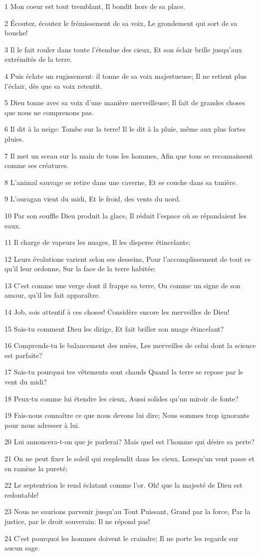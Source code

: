 \par 1 Mon coeur est tout tremblant, Il bondit hors de sa place.
\par 2 Écoutez, écoutez le frémissement de sa voix, Le grondement qui sort de sa bouche!
\par 3 Il le fait rouler dans toute l'étendue des cieux, Et son éclair brille jusqu'aux extrémités de la terre.
\par 4 Puis éclate un rugissement: il tonne de sa voix majestueuse; Il ne retient plus l'éclair, dès que sa voix retentit.
\par 5 Dieu tonne avec sa voix d'une manière merveilleuse; Il fait de grandes choses que nous ne comprenons pas.
\par 6 Il dit à la neige: Tombe sur la terre! Il le dit à la pluie, même aux plus fortes pluies.
\par 7 Il met un sceau sur la main de tous les hommes, Afin que tous se reconnaissent comme ses créatures.
\par 8 L'animal sauvage se retire dans une caverne, Et se couche dans sa tanière.
\par 9 L'ouragan vient du midi, Et le froid, des vents du nord.
\par 10 Par son souffle Dieu produit la glace, Il réduit l'espace où se répandaient les eaux.
\par 11 Il charge de vapeurs les nuages, Il les disperse étincelants;
\par 12 Leurs évolutions varient selon ses desseins, Pour l'accomplissement de tout ce qu'il leur ordonne, Sur la face de la terre habitée;
\par 13 C'est comme une verge dont il frappe sa terre, Ou comme un signe de son amour, qu'il les fait apparaître.
\par 14 Job, sois attentif à ces choses! Considère encore les merveilles de Dieu!
\par 15 Sais-tu comment Dieu les dirige, Et fait briller son nuage étincelant?
\par 16 Comprends-tu le balancement des nuées, Les merveilles de celui dont la science est parfaite?
\par 17 Sais-tu pourquoi tes vêtements sont chauds Quand la terre se repose par le vent du midi?
\par 18 Peux-tu comme lui étendre les cieux, Aussi solides qu'un miroir de fonte?
\par 19 Fais-nous connaître ce que nous devons lui dire; Nous sommes trop ignorants pour nous adresser à lui.
\par 20 Lui annoncera-t-on que je parlerai? Mais quel est l'homme qui désire sa perte?
\par 21 On ne peut fixer le soleil qui resplendit dans les cieux, Lorsqu'un vent passe et en ramène la pureté;
\par 22 Le septentrion le rend éclatant comme l'or. Oh! que la majesté de Dieu est redoutable!
\par 23 Nous ne saurions parvenir jusqu'au Tout Puissant, Grand par la force, Par la justice, par le droit souverain: Il ne répond pas!
\par 24 C'est pourquoi les hommes doivent le craindre; Il ne porte les regards sur aucun sage.

